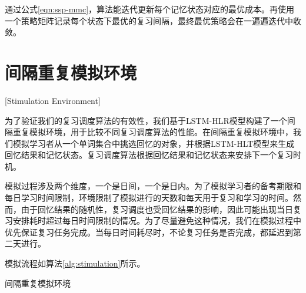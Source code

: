 通过公式\ref{eqn:ssp-mmc}，算法能迭代更新每个记忆状态对应的最优成本。再使用一个策略矩阵记录每个状态下最优的复习间隔，最终最优策略会在一遍遍迭代中收敛。

\section{间隔重复模拟环境}[Stimulation Environment]

为了验证我们的复习调度算法的有效性，我们基于LSTM-HLR模型构建了一个间隔重复模拟环境，用于比较不同复习调度算法的性能。在间隔重复模拟环境中，我们模拟学习者从一个单词集合中挑选回忆的对象，并根据LSTM-HLT模型来生成回忆结果和记忆状态。复习调度算法根据回忆结果和记忆状态来安排下一个复习时机。

模拟过程涉及两个维度，一个是日间，一个是日内。为了模拟学习者的备考期限和每日学习时间限制，环境限制了模拟进行的天数和每天用于复习和学习的时间。然而，由于回忆结果的随机性，复习调度也受回忆结果的影响，因此可能出现当日复习安排耗时超过每日时间限制的情况。为了尽量避免这种情况，我们在模拟过程中优先保证复习任务完成。当每日时间耗尽时，不论复习任务是否完成，都延迟到第二天进行。

模拟流程如算法\ref{alg:stimulation}所示。

\begin{algorithm}[htbp]
\caption{间隔重复模拟环境}
\label{alg:stimulation}
\end{algorithm}

